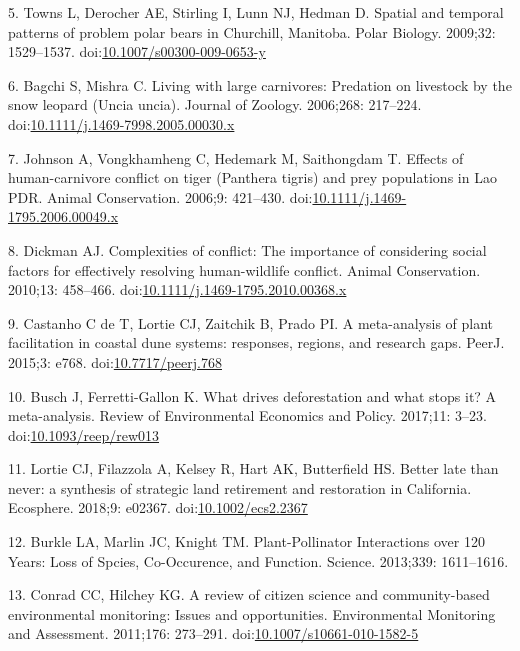 \documentclass[10pt,letterpaper]{article}
\begin{document}
\hypertarget{ref-Towns2009}{}
5. Towns L, Derocher AE, Stirling I, Lunn NJ, Hedman D. Spatial and
temporal patterns of problem polar bears in Churchill, Manitoba. Polar
Biology. 2009;32: 1529--1537.
doi:\href{https://doi.org/10.1007/s00300-009-0653-y}{10.1007/s00300-009-0653-y}

\hypertarget{ref-Bagchi2006}{}
6. Bagchi S, Mishra C. Living with large carnivores: Predation on
livestock by the snow leopard (Uncia uncia). Journal of Zoology.
2006;268: 217--224.
doi:\href{https://doi.org/10.1111/j.1469-7998.2005.00030.x}{10.1111/j.1469-7998.2005.00030.x}

\hypertarget{ref-Johnson2006}{}
7. Johnson A, Vongkhamheng C, Hedemark M, Saithongdam T. Effects of
human-carnivore conflict on tiger (Panthera tigris) and prey populations
in Lao PDR. Animal Conservation. 2006;9: 421--430.
doi:\href{https://doi.org/10.1111/j.1469-1795.2006.00049.x}{10.1111/j.1469-1795.2006.00049.x}

\hypertarget{ref-Dickman2010}{}
8. Dickman AJ. Complexities of conflict: The importance of considering
social factors for effectively resolving human-wildlife conflict. Animal
Conservation. 2010;13: 458--466.
doi:\href{https://doi.org/10.1111/j.1469-1795.2010.00368.x}{10.1111/j.1469-1795.2010.00368.x}

\hypertarget{ref-Castanho2015}{}
9. Castanho C de T, Lortie CJ, Zaitchik B, Prado PI. A meta-analysis of
plant facilitation in coastal dune systems: responses, regions, and
research gaps. PeerJ. 2015;3: e768.
doi:\href{https://doi.org/10.7717/peerj.768}{10.7717/peerj.768}

\hypertarget{ref-Busch2017}{}
10. Busch J, Ferretti-Gallon K. What drives deforestation and what stops
it? A meta-analysis. Review of Environmental Economics and Policy.
2017;11: 3--23.
doi:\href{https://doi.org/10.1093/reep/rew013}{10.1093/reep/rew013}

\hypertarget{ref-Lortie2018}{}
11. Lortie CJ, Filazzola A, Kelsey R, Hart AK, Butterfield HS. Better
late than never: a synthesis of strategic land retirement and
restoration in California. Ecosphere. 2018;9: e02367.
doi:\href{https://doi.org/10.1002/ecs2.2367}{10.1002/ecs2.2367}

\hypertarget{ref-Burkle2013}{}
12. Burkle LA, Marlin JC, Knight TM. Plant-Pollinator Interactions over
120 Years: Loss of Spcies, Co-Occurence, and Function. Science.
2013;339: 1611--1616.

\hypertarget{ref-Conrad2011}{}
13. Conrad CC, Hilchey KG. A review of citizen science and
community-based environmental monitoring: Issues and opportunities.
Environmental Monitoring and Assessment. 2011;176: 273--291.
doi:\href{https://doi.org/10.1007/s10661-010-1582-5}{10.1007/s10661-010-1582-5}
\end{document}
